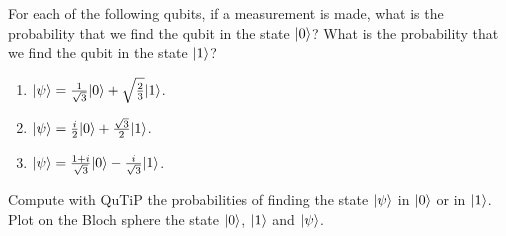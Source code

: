 \begin{exercise}
For each of the following qubits, if a measurement is made, what is the
probability that we find the qubit in the state $\vert0\rangle$? What is the
probability that we find the qubit in the state $\vert1\rangle$?
\begin{enumerate}
 \item $\vert\psi\rangle=\frac{1}{\sqrt{3}}\vert0\rangle+\sqrt{\frac{2}{3}}\vert1\rangle$.
 \item $\vert\psi\rangle=\frac{i}{2}\vert0\rangle+\frac{\sqrt{3}}{2}\vert1\rangle$.
 \item $\vert\psi\rangle=\frac{1+i}{\sqrt{3}}\vert0\rangle-\frac{i}{\sqrt{3}}\vert1\rangle$.
\end{enumerate}
 Compute with QuTiP the probabilities of finding the state $\vert\psi\rangle$ in 
$\vert0\rangle$ or in $\vert1\rangle$. Plot on the Bloch sphere the state $\vert0\rangle$, 
$\vert1\rangle$ and $\vert\psi\rangle$.
\end{exercise}

